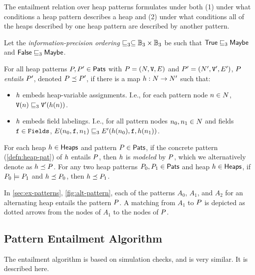 The entailment relation over heap patterns formulates under both (1)
under what conditions a heap pattern describes a heap and (2) under
what conditions all of the heaps described by one heap pattern are
described by another pattern.
%
\begin{defn}
  \label{defn:match}
  Let the \emph{information-precision ordering} $\sqsubseteq_3 \subseteq
  \mathbb{B}_3 \times \mathbb{B}_3$ be such that $\mathsf{True} \sqsubseteq_3 \mathsf{Maybe}$
  and $\mathsf{False} \sqsubseteq_3 \mathsf{Maybe}$.

  For all heap patterns $P, P' \in \mathsf{Pats}$ with $P =
  (N, \mathtt{V}, E)$ and $P' = (N',
  \mathtt{V}', E')$, $P$ \emph{entails} $P'$, denoted
  $P \preceq P'$, if there is a map $h: N
  \to N'$ such that:
  \begin{itemize}
  \item
    $h$ embeds heap-variable assignments.
    I.e., for each pattern node $n \in N$,
    $\mathtt{V}(n) \sqsubseteq_3 \mathtt{V}'(h(n))$.
  \item
    $h$ embeds field labelings.
    I.e., for all pattern nodes $n_0, n_1 \in N$
    and fields $\mathtt{f} \in \mathtt{Fields}$, $E(n_0, \mathtt{f},
    n_1) \sqsubseteq_3 E'(h(n_0), \mathtt{f},
    h(n_1))$.
  \end{itemize}
\end{defn}
For each heap $h \in \mathsf{Heaps}$ and pattern $P \in \mathsf{Pats}$,
if the concrete pattern (\autoref{defn:heap-pat}) of $h$ entails
$P$, then $h$ is \emph{modeled} by $P$, which we
alternatively denote as $h \preceq P$.
%
For any two heap patterns $P_0, P_1 \in \mathsf{Pats}$ and heap
$h \in \mathsf{Heaps}$, if $P_0 \models P_1$ and $h
\preceq P_0$, then $h \preceq P_1$.
%
\begin{defn}
  \label{ex:pat-entails}
  In \autoref{sec:ex-patterns}, \autoref{fig:alt-pattern}, each of the
  patterns $A_0$, $A_1$, and $A_2$ for an alternating heap entails the
  pattern $P$.
  A matching from $A_1$ to $P$ is depicted as dotted arrows from
  the nodes of $A_1$ to the nodes of $P$.
\end{defn}

\subsection{Pattern Entailment Algorithm}
\label{sec:entailment-algorithm}

The entailment algorithm is based on simulation checks, and is very similar. It is described here.